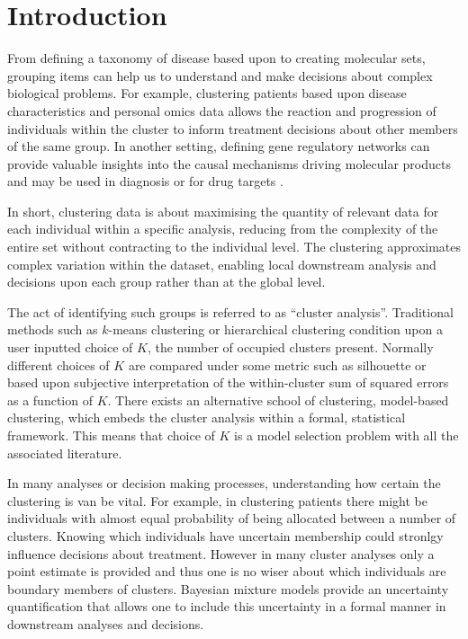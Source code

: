 \documentclass{bioinfo}
\begin{document}
\section{Introduction}

From defining a taxonomy of disease based upon to creating molecular sets, grouping items can help us to understand and make decisions about complex biological problems. For example, clustering patients based upon disease characteristics and personal omics data allows the reaction and progression of individuals within the cluster to inform treatment decisions about other members of the same group. In another setting, defining gene regulatory networks can provide valuable insights into the causal mechanisms driving molecular products and may be used in diagnosis or for drug targets \citep{emmert2014gene}. 

In short, clustering data is about maximising the quantity of relevant data for each individual within a specific analysis, reducing from the complexity of the entire set without contracting to the individual level. The clustering approximates complex variation within the dataset, enabling local downstream analysis and decisions upon each group rather than at the global level. 

The act of identifying such groups is referred to as “cluster analysis”. Traditional methods such as $k$-means clustering \citep{lloyd1982least, forgy1965cluster} or hierarchical clustering condition upon a user inputted choice of $K$, the number of occupied clusters present. Normally different choices of $K$ are compared under some metric such as silhouette or based upon subjective interpretation of the within-cluster sum of squared errors as a function of $K$. There exists an alternative school of clustering, model-based clustering, which embeds the cluster analysis within a formal, statistical framework. This means that choice of $K$ is a model selection problem with all the associated literature. 

In many analyses or decision making processes, understanding how certain the clustering is van be vital. For example, in clustering patients there might be individuals with almost equal probability of being allocated between a number of clusters. Knowing which individuals have uncertain membership could stronlgy influence decisions about treatment. However in many cluster analyses only a point estimate is provided and thus one is no wiser about which individuals are boundary members of clusters. Bayesian mixture models provide an uncertainty quantification that allows one to include this uncertainty in a formal manner in downstream analyses and decisions.
\end{document}
